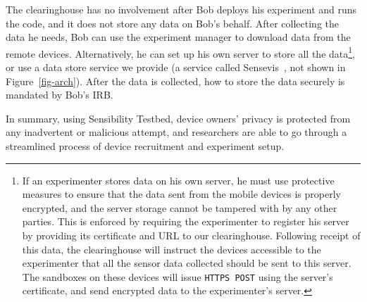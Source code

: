 The clearinghouse has no involvement after Bob deploys 
his experiment and runs the code, and it does not store any
data on Bob's behalf. After collecting the data he needs, Bob 
can use the experiment manager to download data from the remote devices. 
Alternatively, he can set up his own server to store all the data\footnote{\scriptsize
If an experimenter stores data on his own server, he must use protective
measures to ensure that the data sent from the mobile devices is
properly encrypted, and the server storage cannot be tampered
with by any other parties. This is enforced by requiring the experimenter to register
his server by providing its certificate and URL to our
clearinghouse. Following receipt of this data, the clearinghouse will instruct the devices
accessible to the experimenter that all the sensor data collected should be
sent to this server. The sandboxes on these devices will issue
\texttt{HTTPS POST} using the server's certificate, and send encrypted
data to the experimenter's server.}, or use a data 
store service we provide (a service called Sensevis~\cite{sensevis}, 
not shown in Figure~\ref{fig-arch}). After the data is collected, how to store
the data securely is mandated by Bob's IRB.

\smallskip
In summary, 
%
%
using Sensibility Testbed, device owners' privacy is protected
from any inadvertent or malicious attempt, and researchers 
are able to go through a streamlined process of device 
recruitment and experiment setup.

